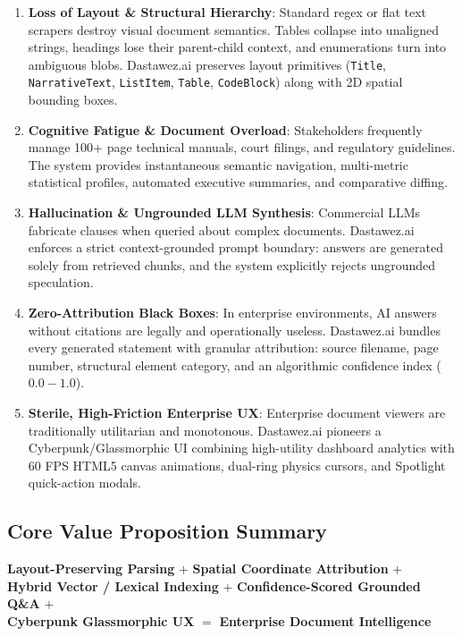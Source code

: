 \documentclass[11pt,a4paper]{article}
\begin{document}
\begin{enumerate}[leftmargin=*]
    \item \textbf{Loss of Layout \& Structural Hierarchy}: Standard regex or flat text scrapers destroy visual document semantics. Tables collapse into unaligned strings, headings lose their parent-child context, and enumerations turn into ambiguous blobs. Dastawez.ai preserves layout primitives (\texttt{Title}, \texttt{NarrativeText}, \texttt{ListItem}, \texttt{Table}, \texttt{CodeBlock}) along with 2D spatial bounding boxes.
    \item \textbf{Cognitive Fatigue \& Document Overload}: Stakeholders frequently manage 100+ page technical manuals, court filings, and regulatory guidelines. The system provides instantaneous semantic navigation, multi-metric statistical profiles, automated executive summaries, and comparative diffing.
    \item \textbf{Hallucination \& Ungrounded LLM Synthesis}: Commercial LLMs fabricate clauses when queried about complex documents. Dastawez.ai enforces a strict context-grounded prompt boundary: answers are generated solely from retrieved chunks, and the system explicitly rejects ungrounded speculation.
    \item \textbf{Zero-Attribution Black Boxes}: In enterprise environments, AI answers without citations are legally and operationally useless. Dastawez.ai bundles every generated statement with granular attribution: source filename, page number, structural element category, and an algorithmic confidence index ($0.0 - 1.0$).
    \item \textbf{Sterile, High-Friction Enterprise UX}: Enterprise document viewers are traditionally utilitarian and monotonous. Dastawez.ai pioneers a Cyberpunk/Glassmorphic UI combining high-utility dashboard analytics with 60 FPS HTML5 canvas animations, dual-ring physics cursors, and Spotlight quick-action modals.
\end{enumerate}

\subsection{Core Value Proposition Summary}
\begin{tcolorbox}[colback=codebg,colframe=primaryblue,title=\textbf{The Dastawez.ai Crux Formula}]
\centering
\textbf{Layout-Preserving Parsing} $+$ \textbf{Spatial Coordinate Attribution} $+$ \\
\textbf{Hybrid Vector / Lexical Indexing} $+$ \textbf{Confidence-Scored Grounded Q\&A} $+$ \\
\textbf{Cyberpunk Glassmorphic UX} $=$ \textbf{Enterprise Document Intelligence}
\end{tcolorbox}
\end{document}
